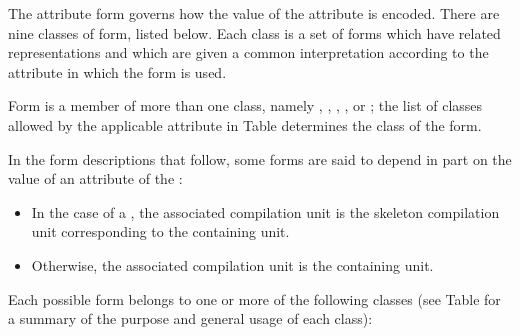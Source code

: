 \begin{centering}
\begin{longtable}{l|c|l}
\end{longtable} 
\end{centering}

The attribute form governs how the value of the attribute is
encoded. There are nine classes of form, listed below. Each
class is a set of forms which have related representations
and which are given a common interpretation according to the
attribute in which the form is used.

Form \DWFORMsecoffsetTARG{} 
is a member of more 
than 
one 
class,
namely 
\CLASSaddrptr, 
\CLASSlineptr, 
\CLASSloclistptr, 
\CLASSmacptr,  
\CLASSrangelistptr{} or
\CLASSstroffsetsptr; 
the list of classes allowed by the applicable attribute in 
Table 
determines the class of the form.

In the form descriptions that follow, some forms are said
to depend in part on the value of an attribute of the
:
\begin{itemize}
\item
In the case of a \splitDWARFobjectfile{}, the associated
compilation unit is the skeleton compilation unit corresponding 
to the containing unit.
\item Otherwise, the associated compilation unit 
is the containing unit.
\end{itemize}

Each possible form belongs to one or more of the following classes
(see Table  for a summary of
the purpose and general usage of each class):

